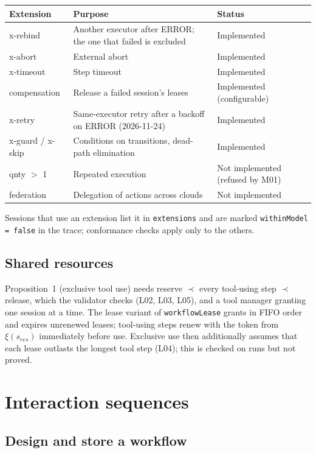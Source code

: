 \documentclass[a4paper]{arrowhead}
\begin{document}
{\small
\begin{longtable}{|p{3.0cm}|p{8.2cm}|p{4.6cm}|}

\hline
\rowcolor{gray!33} Extension & Purpose & Status \\ \hline
\endhead
x-rebind & Another executor after ERROR; the one that failed is excluded & Implemented \\ \hline
x-abort & External abort & Implemented \\ \hline
x-timeout & Step timeout & Implemented \\ \hline
compensation & Release a failed session's leases & Implemented (configurable) \\ \hline
x-retry & Same-executor retry after a backoff on ERROR (2026-11-24) & Implemented \\ \hline
x-guard / x-skip & Conditions on transitions, dead-path elimination & Implemented \\ \hline
qnty $>$ 1 & Repeated execution & Not implemented (refused by M01) \\ \hline
federation & Delegation of actions across clouds & Not implemented \\ \hline
\end{longtable}
}

Sessions that use an extension list it in \texttt{extensions} and are marked \texttt{withinModel = false} in the trace;
conformance checks apply only to the others.

\subsection{Shared resources}
Proposition~1 (exclusive tool use) needs reserve $\prec$ every tool-using step $\prec$ release, which the validator checks
(L02, L03, L05), and a tool manager granting one session at a time. The lease variant of \texttt{workflowLease} grants in
FIFO order and expires unrenewed leases; tool-using steps renew with the token from $\xi(s_{res})$ immediately before
use. Exclusive use then additionally assumes that each lease outlasts the longest tool step (L04); this is checked on runs
but not proved.

\newpage
\section{Interaction sequences}
\label{sec:sequences}
\subsection{Design and store a workflow}
\end{document}
